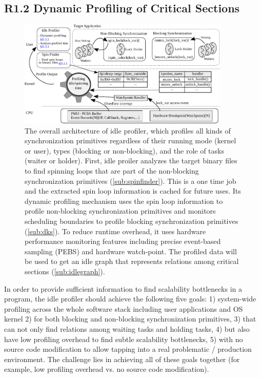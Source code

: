 \subsection{R1.2 Dynamic Profiling of Critical Sections}
\label{sub:dks}

\begin{figure}[t]
\centering
\includegraphics[width=0.90\textwidth]{fig/idleprofiler-dynsync}
\caption{
  The overall architecture of idle profiler, which profiles all kinds
  of synchronization primitives regardless of their running mode
  (kernel or user), types (blocking or non-blocking), and the role of
  tasks (waiter or holder). First, idle proiler analyzes the target
  binary files to find spinning loops that are part of the non-blocking
  synchronization primitives (\autoref{sub:spinfinder}). This is a one time
  job and the extracted spin loop information is cached for future uses.
  Its dynamic profiling mechanism uses the spin loop
  information to profile non-blocking synchronization primitives and
  monitors scheduling boundaries to profile blocking synchronization
  primitives (\autoref{sub:dks}). To reduce runtime overhead,
  it uses hardware performance monitoring features including precise
  event-based sampling (PEBS) and hardware watch-point. The profiled
  data will be used to get an idle graph that represents relations
  among critical sections (\autoref{sub:idlegraph}).
}
\label{f:idleprofiler-overview}
\vspace{-5px}
\end{figure}

\boxbeg
\begin{Challenge}
  In order to provide sufficient information to find scalability
  bottlenecks in a program, the idle profiler should achieve the
  following five goals:
  1) system-wide profiling across the whole software stack including
  user applications and OS kernel 2) for both blocking and non-blocking
  synchronization primitives, 3) that can not only find relations among
  waiting tasks and holding tasks, 4) but also have low profiling overhead
  to find subtle scalability bottlenecks, 5) with no source code modification
  to allow tapping into a real problematic / production environment.
  The challenge lies in achieving all of these goals together
  (for example, low profiling overhead vs. no source code modification).
\end{Challenge}
\boxend

